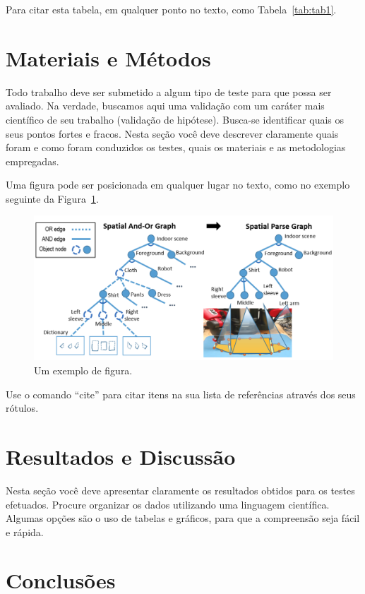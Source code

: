 \documentclass[twoside,conference,a4paper]{IEEEtran}
\begin{document}
Para citar esta tabela, em qualquer ponto no texto, como Tabela~\ref{tab:tab1}.


\section{Materiais e Métodos}

Todo trabalho deve ser submetido a algum tipo de teste para que possa ser avaliado. Na verdade, buscamos aqui uma validação com um caráter mais científico de seu trabalho (validação de hipótese). Busca-se identificar quais os seus pontos fortes e fracos. Nesta seção você deve descrever claramente quais foram e como foram conduzidos os testes, quais os materiais e as metodologias empregadas.   

Uma figura pode ser posicionada em qualquer lugar no texto, como no exemplo seguinte da Figura~\ref{fig:fig1}.

\begin{figure}[ht]
\centering
\includegraphics[width=1\hsize]{figuras/pipeline.png}
\caption{Um exemplo de figura.}
\label{fig:fig1}
\end{figure}

Use o comando ``cite'' para citar itens na sua lista de
referências através dos seus rótulos.


\section{Resultados e Discussão}

Nesta seção você deve apresentar claramente os resultados obtidos para os testes efetuados. Procure organizar os dados utilizando uma linguagem científica. Algumas opções são o uso de tabelas e gráficos, para que a compreensão seja fácil e rápida. 

\section{Conclusões}
\end{document}
